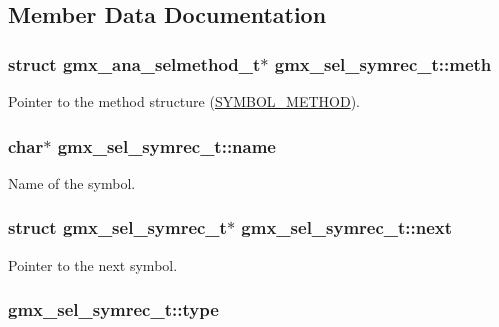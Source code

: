\subsection{\-Member \-Data \-Documentation}
\hypertarget{structgmx__sel__symrec__t_afb394f5faec4fea6013f8b8c9f0ef3ad}{
\subsubsection[{meth}]{\setlength{\rightskip}{0pt plus 5cm}struct {\bf gmx\-\_\-ana\-\_\-selmethod\-\_\-t}$\ast$ {\bf gmx\-\_\-sel\-\_\-symrec\-\_\-t\-::meth}}}\label{structgmx__sel__symrec__t_afb394f5faec4fea6013f8b8c9f0ef3ad}
\-Pointer to the method structure (\hyperlink{symrec_8h_a3d55b48f8dc057ea3df3fdc68ee116cbaf01b9ff567abb29e453bc1a7313dd2bd}{\-S\-Y\-M\-B\-O\-L\-\_\-\-M\-E\-T\-H\-O\-D}). \hypertarget{structgmx__sel__symrec__t_aea6127c0ebfc57df0bce799a1e039d0e}{
\subsubsection[{name}]{\setlength{\rightskip}{0pt plus 5cm}char$\ast$ {\bf gmx\-\_\-sel\-\_\-symrec\-\_\-t\-::name}}}\label{structgmx__sel__symrec__t_aea6127c0ebfc57df0bce799a1e039d0e}
\-Name of the symbol. \hypertarget{structgmx__sel__symrec__t_a32967616ec7f90798abf0853b5fe93f0}{
\subsubsection[{next}]{\setlength{\rightskip}{0pt plus 5cm}struct {\bf gmx\-\_\-sel\-\_\-symrec\-\_\-t}$\ast$ {\bf gmx\-\_\-sel\-\_\-symrec\-\_\-t\-::next}}}\label{structgmx__sel__symrec__t_a32967616ec7f90798abf0853b5fe93f0}
\-Pointer to the next symbol. \hypertarget{structgmx__sel__symrec__t_a938572eb28083f03d102603245e30803}{
\subsubsection[{type}]{ {\bf gmx\-\_\-sel\-\_\-symrec\-\_\-t\-::type}}}\label{structgmx__sel__symrec__t_a938572eb28083f03d102603245e30803}

